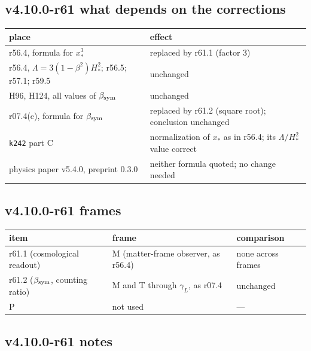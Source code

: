 \subsection*{v4.10.0-r61 what depends on the corrections}
\label{subsec:v4100-r61-impact}

\begin{center}
\small
\begin{tabular}{@{}>{\raggedright\arraybackslash}p{}>{\raggedright\arraybackslash}p{}@{}}
\toprule
place & effect\\
\midrule
r56.4, formula for \(x_*^3\) & replaced by r61.1 (factor 3)\\
r56.4, \(\Lambda=3(1-\beta^2)H_*^2\); r56.5; r57.1; r59.5 & unchanged\\
H96, H124, all values of \(\beta_{\rm sym}\) & unchanged\\
r07.4(c), formula for \(\beta_{\rm sym}\) & replaced by r61.2 (square root); conclusion unchanged\\
\texttt{k242} part C & normalization of \(x_*\) as in r56.4; its \(\Lambda/H_*^2\) value correct\\
physics paper v5.4.0, preprint 0.3.0 & neither formula quoted; no change needed\\
\bottomrule
\end{tabular}
\end{center}

\subsection*{v4.10.0-r61 frames}
\label{subsec:v4100-r61-frames}

\begin{center}
\small
\begin{tabular}{@{}lll@{}}
\toprule
item & frame & comparison\\
\midrule
r61.1 (cosmological readout) & M (matter-frame observer, as r56.4) & none across frames\\
r61.2 (\(\beta_{\rm sym}\), counting ratio) & M and T through \(\gamma_L\), as r07.4 & unchanged\\
P & not used & ---\\
\bottomrule
\end{tabular}
\end{center}

\subsection*{v4.10.0-r61 notes}
\label{subsec:v4100-r61-notes}

